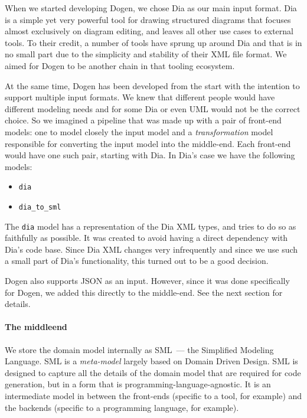 \documentclass{book}
\begin{document}
When we started developing Dogen, we chose Dia as our main input
format. Dia is a simple yet very powerful tool for drawing structured
diagrams that focuses almost exclusively on diagram editing, and
leaves all other use cases to external tools. To their credit, a
number of tools have sprung up around Dia and that is in no small part
due to the simplicity and stability of their XML file format. We aimed
for Dogen to be another chain in that tooling ecosystem.

At the same time, Dogen has been developed from the start with the
intention to support multiple input formats. We knew that different
people would have different modeling needs and for some Dia or even
UML would not be the correct choice. So we imagined a pipeline that
was made up with a pair of front-end models: one to model closely the
input model and a \emph{transformation} model responsible for
converting the input model into the middle-end. Each front-end would
have one such pair, starting with Dia. In Dia's case we have the
following models:

\begin{itemize}
\item \texttt{dia}
\item \texttt{dia\_to\_sml}
\end{itemize}

The \texttt{dia} model has a representation of the Dia XML types, and
tries to do so as faithfully as possible. It was created to avoid
having a direct dependency with Dia's code base. Since Dia XML changes
very infrequently and since we use such a small part of Dia's
functionality, this turned out to be a good decision.

Dogen also supports JSON as an input. However, since it was done
specifically for Dogen, we added this directly to the middle-end. See
the next section for details.

\paragraph{The middleend}

We store the domain model internally as SML~--- the Simplified
Modeling Language. SML is a \emph{meta-model} largely based on Domain
Driven Design. SML is designed to capture all the details of the
domain model that are required for code generation, but in a form that
is programming-language-agnostic. It is an intermediate model in
between the front-ends (specific to a tool, for example) and the
backends (specific to a programming language, for example).
\end{document}
